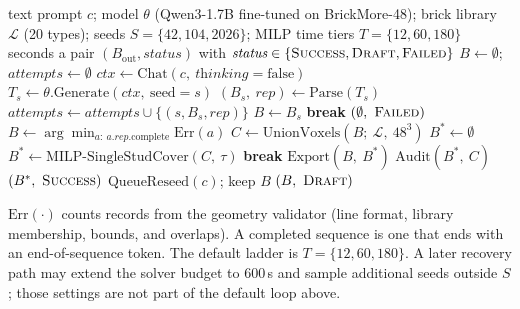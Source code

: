 \documentclass[10pt,twocolumn,letterpaper]{article}
\begin{document}
\begin{algorithm}[t]
\caption{BrickMore-48 inference and retiling}
\label{alg:inference-retiling}
\begin{algorithmic}[1]
\Require text prompt $c$; model $\theta$ (Qwen3-1.7B fine-tuned on BrickMore-48); brick library $\mathcal{L}$ (20 types); seeds $S=\{42,104,2026\}$; MILP time tiers $T=\{12,60,180\}$ seconds
\Ensure a pair $(B_{\mathrm{out}}, \textit{status})$ with $\textit{status}\in\{\textsc{Success},\textsc{Draft},\textsc{Failed}\}$
\State $B \gets \emptyset$; $\textit{attempts} \gets \emptyset$
    \State $\textit{ctx} \gets \mathrm{Chat}(c,\ \textit{thinking}=\mathrm{false})$
    \State $T_s \gets \theta.\mathrm{Generate}(\textit{ctx},\ \mathrm{seed}=s)$ 
    \State $(B_s,\ \textit{rep}) \gets \mathrm{Parse}(T_s)$ 
    \State $\textit{attempts} \gets \textit{attempts} \cup \{(s,B_s,\textit{rep})\}$
        \State $B \gets B_s$
        \State \textbf{break}
    \EndIf
\EndFor
{}
        \State \Return $(\emptyset,\ \textsc{Failed})$
    \EndIf
    \State $B \gets \arg\min_{a:\ a.\textit{rep}.\mathrm{complete}} \mathrm{Err}(a)$ 
\EndIf
\State $C \gets \mathrm{UnionVoxels}(B;\ \mathcal{L},\ 48^3)$ 
\State $B^{*} \gets \emptyset$
    \State $B^{*} \gets \mathrm{MILP\text{-}SingleStudCover}(C,\ \tau)$
        \State \textbf{break}
    \EndIf
\EndFor
{}
    \State $\mathrm{Export}(B,\ B^{*})$ 
    \State $\mathrm{Audit}(B^{*},\ C)$ 
    \State \Return $(B^{*},\ \textsc{Success})$
\Else
    \State $\mathrm{QueueReseed}(c)$; keep $B$ 
    \State \Return $(B,\ \textsc{Draft})$
\EndIf
\end{algorithmic}
\vspace{0.3em}
{\footnotesize $\mathrm{Err}(\cdot)$ counts records from the geometry validator (line format, library membership, bounds, and overlaps). A completed sequence is one that ends with an end-of-sequence token. The default ladder is $T=\{12,60,180\}$. A later recovery path may extend the solver budget to $600$\,s and sample additional seeds outside $S$; those settings are not part of the default loop above.}
\end{algorithm}
\end{document}
